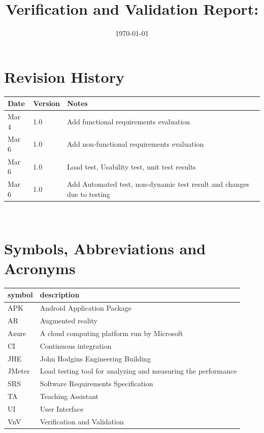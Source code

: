 \documentclass[12pt, titlepage]{article}
\begin{document}
\title{Verification and Validation Report: \progname} 
\author{\authname}
\date{\today}
	
\maketitle


\section{Revision History}

\begin{tabularx}{\textwidth}{p{3cm}p{2cm}X}
\toprule {\bf Date} & {\bf Version} & {\bf Notes}\\
\midrule
Mar 4 & 1.0 & Add functional requirements evaluation\\
Mar 6 & 1.0 & Add non-functional requirements evaluation\\
Mar 6 & 1.0 & Load test, Usability test, unit test results\\
Mar 6 & 1.0 & Add Automated test, non-dynamic test result and changes due to testing\\
\bottomrule
\end{tabularx}

~\newpage

\section{Symbols, Abbreviations and Acronyms}

\renewcommand{\arraystretch}{1.2}
\begin{tabular}{l l} 
  \toprule		
  \textbf{symbol} & \textbf{description}\\
  \midrule 
  APK & Android Application Package\\
  \midrule 
  AR & Augmented reality\\
  \midrule 
  Azure & A cloud computing platform run by Microsoft\\
  \midrule 
  CI & Continuous integration\\
  \midrule 
  JHE & John Hodgins Engineering Building\\
  \midrule 
  JMeter & Load testing tool for analyzing and measuring the performance\\
  \midrule 
  SRS & Software Requirements Specification\\
  \midrule
  TA & Teaching Assistant\\
  \midrule 
  UI & User Interface\\
  \midrule 
  VnV & Verification and Validation\\
  \bottomrule
\end{tabular}\\
\end{document}
